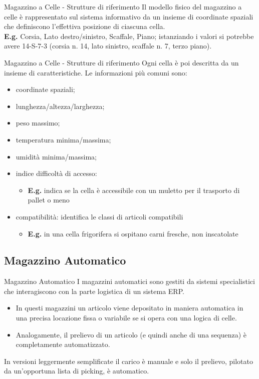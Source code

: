 \documentclass{beamer}
\begin{document}
\begin{frame}{Magazzino a Celle - Strutture di riferimento}
    Il modello fisico del magazzino a celle è rappresentato sul sistema informativo da un insieme di coordinate spaziali che definiscono l'effettiva posizione di ciascuna cella.\\
    \vspace{1.5em}
    \textbf{E.g.} Corsia, Lato destro/sinistro, Scaffale, Piano; istanziando i valori si potrebbe avere 14-S-7-3 (corsia n. 14, lato sinistro, scaffale n. 7, terzo piano).
    \vspace{1.5em}
\end{frame}

\begin{frame}{Magazzino a Celle - Strutture di riferimento}
    Ogni cella è poi descritta da un insieme di caratteristiche. Le informazioni più comuni sono:
    \begin{itemize}
        \item coordinate spaziali;
        \item lunghezza/altezza/larghezza;
        \item peso massimo;
        \item temperatura minima/massima;
        \item umidità minima/massima;
        \item indice difficoltà di accesso:
        \begin{itemize}
            \item \textbf{E.g.} indica se la cella è accessibile con un muletto per il trasporto di pallet o meno
        \end{itemize}
        \item compatibilità: identifica le classi di articoli compatibili
        \begin{itemize}
            \item \textbf{E.g.} in una cella frigorifera si ospitano carni fresche, non inscatolate
        \end{itemize}
    \end{itemize}
\end{frame}

\subsection{Magazzino Automatico}
\begin{frame}{Magazzino Automatico}
    I magazzini automatici sono gestiti da sistemi specialistici che interagiscono con la parte logistica di un sistema ERP.\\
    \begin{itemize}
        \item In questi magazzini un articolo viene depositato in maniera automatica in una precisa locazione fissa o variabile se si opera con una logica di celle.
        \item Analogamente, il prelievo di un articolo (e quindi anche di una sequenza) è completamente automatizzato.
    \end{itemize}
    In versioni leggermente semplificate il carico è manuale e solo il prelievo, pilotato da un’opportuna lista di picking, è automatico.
\end{frame}
\end{document}
